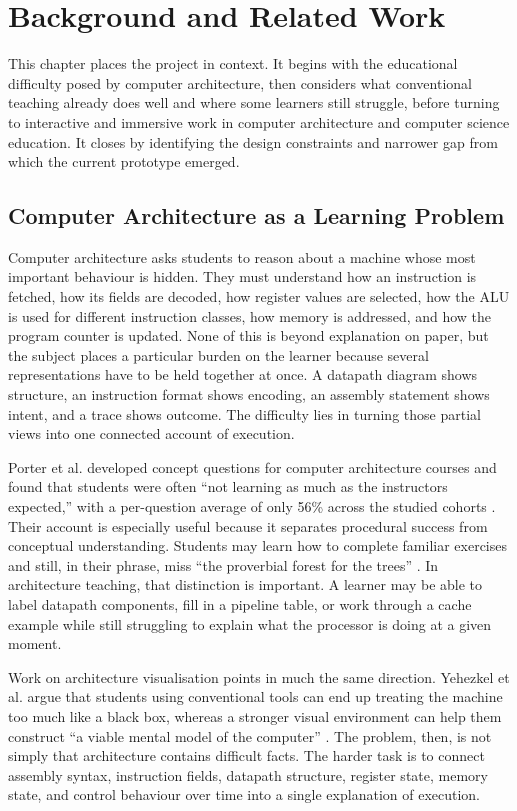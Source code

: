 \chapter{Background and Related Work}

This chapter places the project in context. It begins with the educational difficulty posed by computer architecture, then considers what conventional teaching already does well and where some learners still struggle, before turning to interactive and immersive work in computer architecture and computer science education. It closes by identifying the design constraints and narrower gap from which the current prototype emerged.

\section{Computer Architecture as a Learning Problem}

Computer architecture asks students to reason about a machine whose most important behaviour is hidden. They must understand how an instruction is fetched, how its fields are decoded, how register values are selected, how the ALU is used for different instruction classes, how memory is addressed, and how the program counter is updated. None of this is beyond explanation on paper, but the subject places a particular burden on the learner because several representations have to be held together at once. A datapath diagram shows structure, an instruction format shows encoding, an assembly statement shows intent, and a trace shows outcome. The difficulty lies in turning those partial views into one connected account of execution.

Porter et al. developed concept questions for computer architecture courses and found that students were often ``not learning as much as the instructors expected,'' with a per-question average of only 56\% across the studied cohorts \cite{porter2013evaluating}. Their account is especially useful because it separates procedural success from conceptual understanding. Students may learn how to complete familiar exercises and still, in their phrase, miss ``the proverbial forest for the trees'' \cite{porter2013evaluating}. In architecture teaching, that distinction is important. A learner may be able to label datapath components, fill in a pipeline table, or work through a cache example while still struggling to explain what the processor is doing at a given moment.

Work on architecture visualisation points in much the same direction. Yehezkel et al. argue that students using conventional tools can end up treating the machine too much like a black box, whereas a stronger visual environment can help them construct ``a viable mental model of the computer'' \cite{yehezkel2007contribution}. The problem, then, is not simply that architecture contains difficult facts. The harder task is to connect assembly syntax, instruction fields, datapath structure, register state, memory state, and control behaviour over time into a single explanation of execution.

